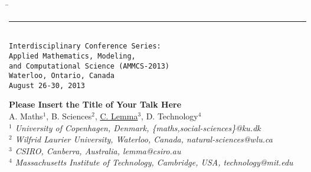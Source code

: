 \documentclass[11pt]{article}
\begin{document}
\thispagestyle{empty}
\begin{tabbing}
\hspace*{4.5in} \= {} \\[-5pt]
\rule{6.8 in}{0.01 in} \\[-2pt]
{ } \> {\footnotesize\tt Interdisciplinary Conference Series:} \\[-5pt]
{} \> {\footnotesize\tt  Applied Mathematics, Modeling,} \\[-5pt]
{} \> {\footnotesize\tt  and Computational Science (AMMCS-2013)} \\[-5pt]
{} \> {\footnotesize\tt  Waterloo, Ontario, Canada} \\[-5pt]
{} \> {\footnotesize\tt  August 26-30, 2013}  \\[-5pt]
\end{tabbing}
%
\vspace{-0.8cm}
\begin{flushleft}
\Large \textbf{\noindent
Please Insert the Title of Your Talk Here}
\\
\vspace{0.5cm}
\normalsize
\normalsize{
 A. Maths$^1$, B. Sciences$^2$, \underline{C. Lemma}$^3$, D. Technology$^4$
} \\
\vspace{5mm}
\textit{\footnotesize
$^1$ University of Copenhagen, Denmark,
\{maths,social-sciences\}@ku.dk\\
$^2$ Wilfrid Laurier University, Waterloo, Canada,
natural-sciences@wlu.ca\\
$^3$ CSIRO, Canberra, Australia,
lemma@csiro.au\\
$^4$ Massachusetts Institute of Technology, Cambridge, USA,
technology@mit.edu\\
}
\end{flushleft}
\end{document}
